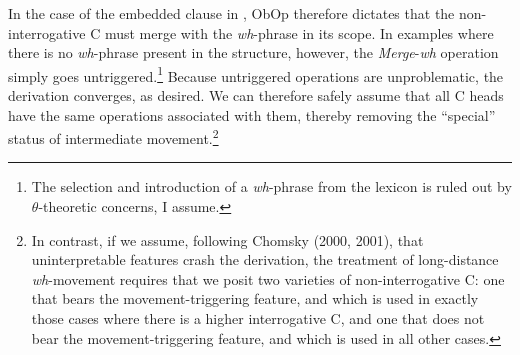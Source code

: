 \documentclass[11pt, letterpaper]{paper_nick}
\begin{document}
In the case of the embedded clause in \LLast, ObOp therefore dictates that the non-interrogative C {must} merge with the \emph{wh}-phrase in its scope. In examples where there is no \emph{wh}-phrase present in the structure, however, the \emph{Merge}-\emph{wh} operation simply goes untriggered.\footnote{The selection and introduction of a \emph{wh}-phrase from the lexicon is ruled out by $\theta$-theoretic concerns, I assume.} Because untriggered operations are unproblematic, the derivation converges, as desired. We can therefore safely assume that all C heads have the same operations associated with them, thereby removing the ``special'' status of intermediate movement.\footnote{In contrast, if we assume, following Chomsky (2000, 2001), that uninterpretable features crash the derivation, the treatment of long-distance \emph{wh}-movement requires that we posit two varieties of non-interrogative C: one that bears the movement-triggering feature, and which is used in exactly those cases where there is a higher interrogative C, and one that does not bear the movement-triggering feature, and which is used in all other cases.} 
\end{document}
